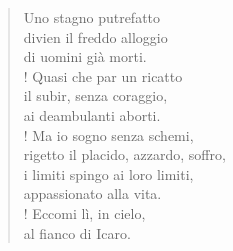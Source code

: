 
\begin{verse}
    Uno stagno putrefatto\\
    divien il freddo alloggio\\
    di uomini già morti.\\!
    Quasi che par un ricatto\\
    il subir, senza coraggio,\\
    ai deambulanti aborti.\\!
    Ma io sogno senza schemi,\\
    rigetto il placido, azzardo, soffro,\\
    i limiti spingo ai loro limiti,\\
    appassionato alla vita.\\!
    Eccomi lì, in cielo,\\
    al fianco di Icaro.
    
\end{verse}